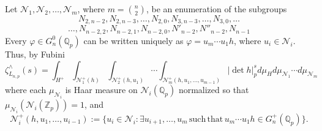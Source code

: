\documentclass[12pt]{article}
\begin{document}
Let $\mathcal{N}_{1},\mathcal{N}_{2},\dots,\mathcal{N}_{m}$, where $m=\binom{n}{2}$, be an enumeration of the subgroups
\[N_{2,n-2},N_{2,n-3},\dots,N_{2,0},N_{3,n-3},\dots,N_{3,0},\dots\]\[\dots,N_{n-2,2},N_{n-2,1},N_{n-2,0},N'_{n-2},N''_{n-2},N_{n-1}\]
Every $\varphi\in{G_{n}^{0}(\mathbb{Q}_{p})}$ can be written uniquely as $\varphi=u_{m}\cdots{u_{1}h}$, where $u_{i}\in{\mathcal{N}_{i}}$. Thus, by Fubini \[
\zeta_{L_{n,p}}^{\wedge}(s)=\displaystyle\int_{H^{+}}\displaystyle\int_{\mathcal{N}_{1}^{+}(h)}\displaystyle\int_{\mathcal{N}_{2}^{+}(h,u_{1})}\cdots\displaystyle\int_{\mathcal{N}_{m}^{+}(h,u_{1},\dots,u_{m-1})}|\det{h}|_{p}^{s}d\mu_{H}d\mu_{\mathcal{N}_{1}}\cdots{d\mu_{\mathcal{N}_{m}}}\]
where each $\mu_{\mathcal{N}_{i}}$ is Haar measure on $\mathcal{N}_{i}(\mathbb{Q}_{p})$ normalized so that\\ $\mu_{\mathcal{N}_{i}}(\mathcal{N}_{i}(\mathbb{Z}_{p}))=1$, and \[\mathcal{N}_{i}^{+}(h,u_{1},\dots,u_{i-1}):=\{u_{i}\in\mathcal{N}_{i} : \exists{u_{i+1},\dots,u_{m}}\,\mathrm{such}\,\mathrm{that}\,u_{m}\cdots{u_{1}}h\in{G_{n}^{+}(\mathbb{Q}_{p})}\}.\]
\end{document}
